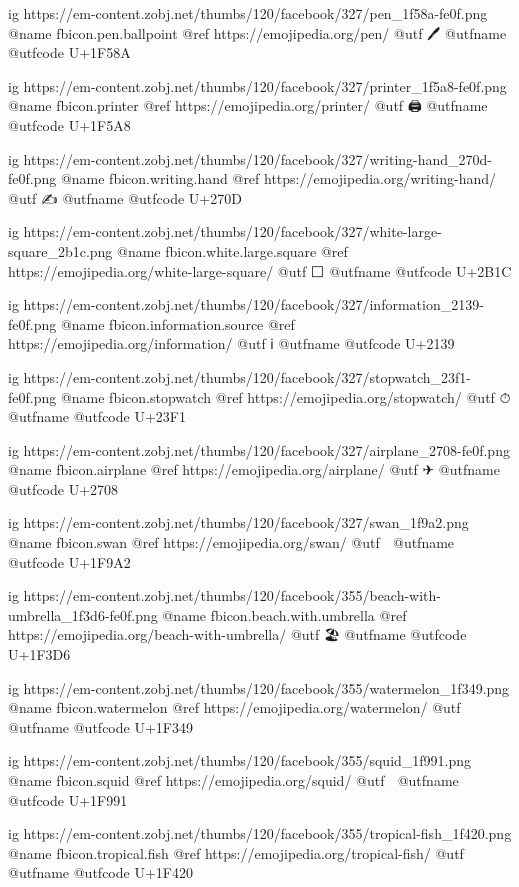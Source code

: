 	ig https://em-content.zobj.net/thumbs/120/facebook/327/pen_1f58a-fe0f.png
	@name fbicon.pen.ballpoint
	@ref https://emojipedia.org/pen/
	@utf 🖊️
	@utfname
	@utfcode U+1F58A

	ig https://em-content.zobj.net/thumbs/120/facebook/327/printer_1f5a8-fe0f.png
	@name fbicon.printer
	@ref https://emojipedia.org/printer/
	@utf 🖨️
	@utfname
	@utfcode U+1F5A8

	ig https://em-content.zobj.net/thumbs/120/facebook/327/writing-hand_270d-fe0f.png
	@name fbicon.writing.hand
	@ref https://emojipedia.org/writing-hand/
	@utf ✍️
	@utfname
	@utfcode U+270D

	ig https://em-content.zobj.net/thumbs/120/facebook/327/white-large-square_2b1c.png
	@name fbicon.white.large.square
	@ref https://emojipedia.org/white-large-square/
	@utf ⬜
	@utfname
	@utfcode U+2B1C

	ig https://em-content.zobj.net/thumbs/120/facebook/327/information_2139-fe0f.png
	@name fbicon.information.source
	@ref https://emojipedia.org/information/
	@utf ℹ
	@utfname
	@utfcode U+2139

	ig https://em-content.zobj.net/thumbs/120/facebook/327/stopwatch_23f1-fe0f.png
	@name fbicon.stopwatch
	@ref https://emojipedia.org/stopwatch/
	@utf ⏱
	@utfname
	@utfcode U+23F1

	ig https://em-content.zobj.net/thumbs/120/facebook/327/airplane_2708-fe0f.png
	@name fbicon.airplane
	@ref https://emojipedia.org/airplane/
	@utf ✈
	@utfname
	@utfcode U+2708

	ig https://em-content.zobj.net/thumbs/120/facebook/327/swan_1f9a2.png
	@name fbicon.swan
	@ref https://emojipedia.org/swan/
	@utf 🦢
	@utfname
	@utfcode U+1F9A2

	ig https://em-content.zobj.net/thumbs/120/facebook/355/beach-with-umbrella_1f3d6-fe0f.png
	@name fbicon.beach.with.umbrella
	@ref https://emojipedia.org/beach-with-umbrella/
	@utf 🏖️
	@utfname
	@utfcode U+1F3D6

	ig https://em-content.zobj.net/thumbs/120/facebook/355/watermelon_1f349.png
	@name fbicon.watermelon
	@ref https://emojipedia.org/watermelon/
	@utf 🍉
	@utfname
	@utfcode U+1F349

	ig https://em-content.zobj.net/thumbs/120/facebook/355/squid_1f991.png
	@name fbicon.squid
	@ref https://emojipedia.org/squid/
	@utf 🦑
	@utfname
	@utfcode U+1F991

	ig https://em-content.zobj.net/thumbs/120/facebook/355/tropical-fish_1f420.png
	@name fbicon.tropical.fish
	@ref https://emojipedia.org/tropical-fish/
	@utf 🐠
	@utfname
	@utfcode U+1F420

